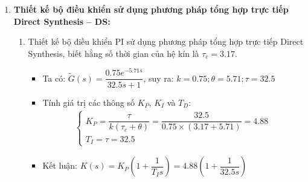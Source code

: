 \begin{solution}
\begin{enumerate}
        \item \textbf{Thiết kế bộ điều khiển sử dụng phương pháp tổng hợp trực tiếp Direct Synthesis -- DS:}
        \begin{enumerate}
            \item Thiết kế bộ điều khiển PI sử dụng phương pháp tổng hợp trực tiếp Direct Synthesis, biết hằng số thời gian của hệ kín là $\tau_c = 3.17$.
                \begin{itemize}
                    \item Ta có: $\tilde{G}(s) = \dfrac{0.75e^{-5.71s}}{32.5s + 1}$, suy ra: $k = 0.75; \theta = 5.71; \tau = 32.5$
                    \item Tính giá trị các thông số $K_P$, $K_I$ và $T_D$:
                        \begin{align*}
                            \left\{\begin{array}{l}
                                K_P = \dfrac{\tau}{k\left({\tau_c + \theta}\right)} = \dfrac{32.5}{0.75 \times \left({3.17 + 5.71}\right)} = 4.88\\
                                T_I = \tau = 32.5
                            \end{array}\right.
                        \end{align*}
                    \item Kết luận: $K(s) = K_P \left({1 + \dfrac{1}{T_I s}}\right) = 4.88 \left({1 + \dfrac{1}{32.5 s}}\right)$
                \end{itemize}


\end{enumerate}
\end{enumerate}
\end{solution}

